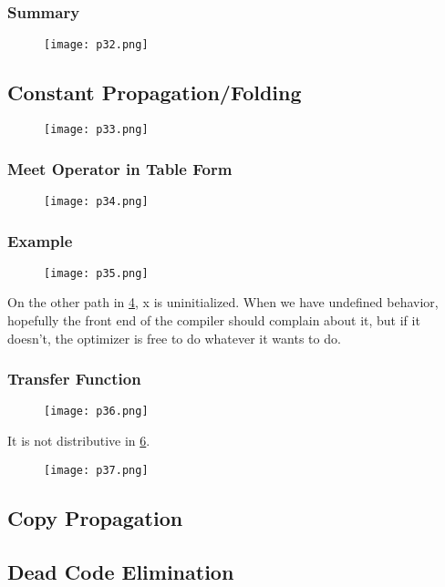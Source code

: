 \subsubsection{Summary}

\begin{figure}[h]
    \centering
    \texttt{[image: p32.png]}
    \caption{}
    \label{fig:p32}
\end{figure}


\subsection{Constant Propagation/Folding}

\begin{figure}[h]
    \centering
    \texttt{[image: p33.png]}
    \caption{}
    \label{fig:p33}
\end{figure}

\subsubsection{Meet Operator in Table Form}
\begin{figure}[h]
    \centering
    \texttt{[image: p34.png]}
    \caption{}
    \label{fig:p34}
\end{figure}


\subsubsection{Example}

\begin{figure}[h]
    \centering
    \texttt{[image: p35.png]}
    \caption{}
    \label{fig:p35}
\end{figure}

On the other path in \ref{fig:p35}, x is uninitialized. When we have undefined behavior, hopefully the front end of the compiler should complain about it, but if it doesn't, the optimizer is free to do whatever it wants to do.


\subsubsection{Transfer Function}


\begin{figure}[h]
    \centering
    \texttt{[image: p36.png]}
    \caption{}
    \label{fig:p36}
\end{figure}



It is not distributive in \ref{fig:p37}.

\begin{figure}[h]
    \centering
    \texttt{[image: p37.png]}
    \caption{}
    \label{fig:p37}
\end{figure}



\subsection{Copy Propagation}

\subsection{Dead Code Elimination}

